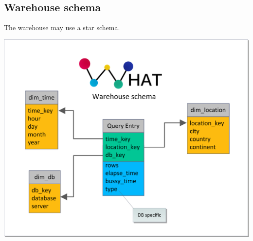 \subsection{Warehouse schema}\label{WHschema}
The warehouse may use a star schema.
\begin{center}
\includegraphics[width=1\linewidth]{Pictures/WareHouseSchema.png}
\end{center}   